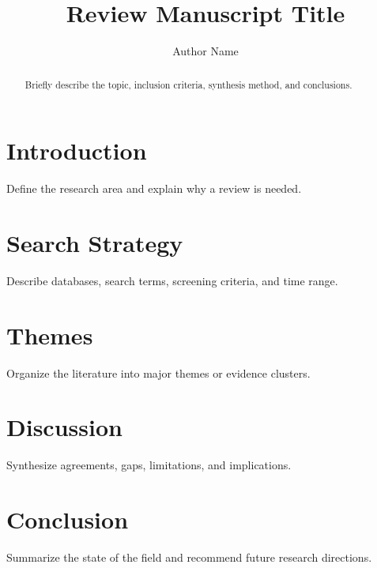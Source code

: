 \documentclass[12pt]{article}
\title{Review Manuscript Title}
\author{Author Name}
\date{}
\begin{document}
\maketitle

\begin{abstract}
Briefly describe the topic, inclusion criteria, synthesis method, and conclusions.
\end{abstract}

\section{Introduction}
Define the research area and explain why a review is needed.

\section{Search Strategy}
Describe databases, search terms, screening criteria, and time range.

\section{Themes}
Organize the literature into major themes or evidence clusters.

\section{Discussion}
Synthesize agreements, gaps, limitations, and implications.

\section{Conclusion}
Summarize the state of the field and recommend future research directions.



\end{document}
